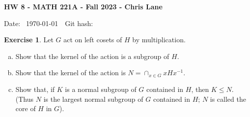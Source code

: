\documentclass[11pt,oneside]{article}
\numberwithin{equation}{section}
\theoremstyle{definition}
\newtheorem{exercise}{Exercise}
\begin{document}
\textbf{HW 8 - MATH 221A - Fall 2023 - Chris Lane}

Date: \hhmmsstime{} \ \today \ \ Git hash: 


\begin{exercise}
  Let $G$ act on left cosets of $H$ by multiplication.
  \begin{enumerate}[(a)]
  \item
    Show that the kernel of the action is a subgroup of $H$.  
  \item
    Show that the kernel of the action is $N = \cap _{x \in G} xHx^{-1}$.
  \item
    Show that, if $K$ is a normal subgroup of $G$ contained in $H$,
    then $K \leq N$.  (Thus $N$ is the largest normal subgroup of $G$
    contained in $H$; $N$ is called the core of $H$ in $G$).
  \end{enumerate}
\end{exercise}
\end{document}
